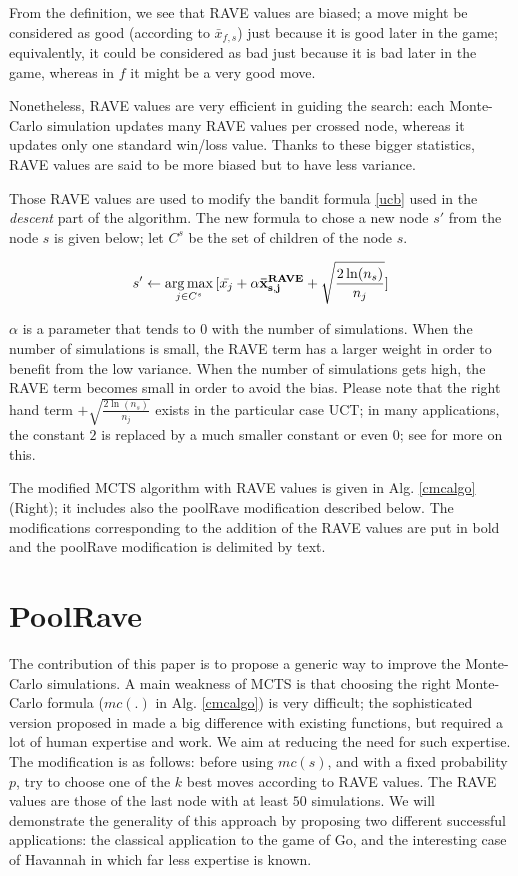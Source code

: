 \documentclass{llncs}
\begin{document}
From the definition, we see that RAVE values are biased; a move might be considered as good (according to $\bar{x}_{f,s}$) just because it is good later in the game; equivalently, it could be considered as bad just because it is bad later in the game, whereas in $f$ it might be a very good move.

Nonetheless, RAVE values are very efficient in guiding the search: each Monte-Carlo simulation updates many RAVE values per crossed node, whereas it updates only one standard win/loss value. Thanks to these bigger statistics, RAVE values are said to be more biased but to have less variance.

Those RAVE values are used to modify the bandit formula \ref{ucb} used in the {\it{descent}} part of the algorithm. The new formula to chose a new node $s'$ from the node $s$ is given below; let $C^s$ be the set of children of the node $s$.

$$ s' \leftarrow  \operatorname*{arg\,max}\limits_{j \in C^s}{[\bar{x_j} + {\bf{ \alpha \bar{x}_{s,j}^{RAVE}}} + \sqrt{\frac{2\ln(n_{s})}{n_j}}]} $$


$\alpha$ is a parameter that tends to $0$ with the number of simulations.
When the number of simulations is small, the RAVE term has a larger weight in order to benefit from the low variance.
When the number of simulations gets high, the RAVE term becomes small in order to avoid the bias. Please note that the right hand term $+\sqrt{\frac{2\ln(n_s)}{n_j}}$ exists in the particular case UCT; in many applications, the constant $2$ is replaced by a much smaller constant or even $0$; see \cite{ieeemogo} for more on this.

The modified MCTS algorithm with RAVE values is given in Alg. \ref{cmcalgo} (Right); it includes also the poolRave modification described below. The modifications corresponding to the addition of the RAVE values are put in bold and the poolRave modification is delimited by text.

\section{PoolRave}\label{poolrave}

The contribution of this paper is to propose a generic way to improve the Monte-Carlo simulations. A main weakness of MCTS is that choosing the right Monte-Carlo formula ($mc(.)$ in Alg. \ref{cmcalgo}) is very difficult; the sophisticated version proposed in \cite{mogofpu} made a big difference with existing functions, but required a lot of human expertise and work. We aim at reducing the need for such expertise.
The modification is as follows:
before using $mc(s)$, and with a fixed probability $p$, try to choose one of the $k$ best moves according to RAVE values. The RAVE values are those of the last node with at least $50$ simulations.
We will demonstrate the generality of this approach by proposing two different successful applications: the classical application to the game of Go, and the interesting case of Havannah in which far less expertise is known.
\end{document}
